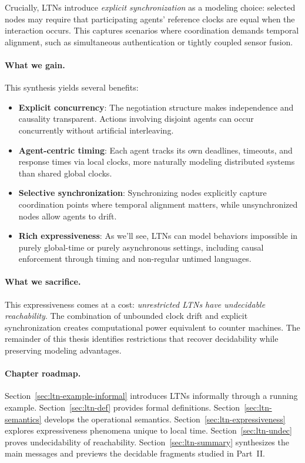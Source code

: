 Crucially, LTNs introduce \emph{explicit synchronization} as a modeling choice:
selected nodes may require that participating agents’ reference clocks are equal
when the interaction occurs.  This captures scenarios where coordination demands
temporal alignment, such as simultaneous authentication or tightly coupled sensor
fusion.

\paragraph{What we gain.} This synthesis yields several benefits:

\begin{itemize}
\item \textbf{Explicit concurrency}: The negotiation structure makes independence and causality transparent. Actions involving disjoint agents can occur concurrently without artificial interleaving.

\item \textbf{Agent-centric timing}: Each agent tracks its own deadlines, timeouts, and response times via local clocks, more naturally modeling distributed systems than shared global clocks.

\item \textbf{Selective synchronization}: Synchronizing nodes explicitly capture coordination points where temporal alignment matters, while unsynchronized nodes allow agents to drift.

\item \textbf{Rich expressiveness}: As we'll see, LTNs can model behaviors impossible in purely global-time or purely asynchronous settings, including causal enforcement through timing and non-regular untimed languages.
\end{itemize}

\paragraph{What we sacrifice.} This expressiveness comes at a cost: \emph{unrestricted LTNs have undecidable reachability}. The combination of unbounded clock drift and explicit synchronization creates computational power equivalent to counter machines. The remainder of this thesis identifies restrictions that recover decidability while preserving modeling advantages.

\paragraph{Chapter roadmap.} Section~\ref{sec:ltn-example-informal} introduces LTNs informally through a running example. Section~\ref{sec:ltn-def} provides formal definitions. Section~\ref{sec:ltn-semantics} develops the operational semantics. Section~\ref{sec:ltn-expressiveness} explores expressiveness phenomena unique to local time. Section~\ref{sec:ltn-undec} proves undecidability of reachability. Section~\ref{sec:ltn-summary} synthesizes the main messages and previews the decidable fragments studied in Part~II.

